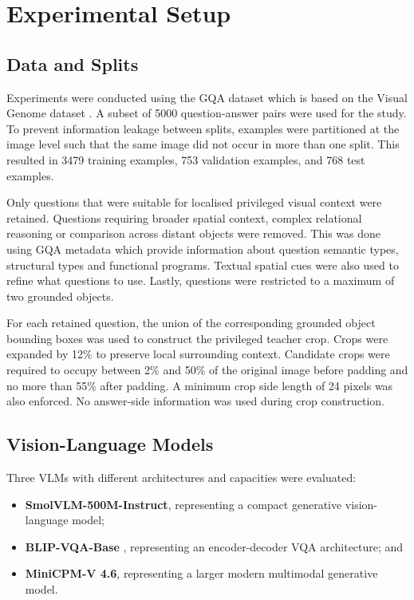 \section{Experimental Setup}\label{experimental_setup}


\subsection{Data and Splits}

Experiments were conducted using the GQA dataset which is based on the Visual Genome dataset \parencite{hudson2019gqa}.
A subset of 5000 question-answer pairs were used for the study. To prevent information leakage between
splits, examples were partitioned at the image level such that the same image did not occur in more than 
one split. This resulted in 3479 training examples, 753 validation examples, and 768 test examples.

Only questions that were suitable for localised privileged visual context were retained. Questions requiring
broader spatial context, complex relational reasoning or comparison across distant objects were removed. This
was done using GQA metadata which provide information about question semantic types, structural types and functional
programs. Textual spatial cues were also used to refine what questions to use. Lastly, questions were
restricted to a maximum of two grounded objects.

For each retained question, the union of the corresponding grounded object bounding boxes was used to 
construct the privileged teacher crop. Crops were expanded by 12\% to preserve local surrounding context.
Candidate crops were required to occupy between 2\% and 50\% of the original image before padding and no more
than 55\% after padding. A minimum crop side length of 24 pixels was also enforced. No answer-side information
was used during crop construction.

\subsection{Vision-Language Models}

Three VLMs with different architectures and capacities were evaluated:

\begin{itemize}
\item \textbf{SmolVLM-500M-Instruct}, representing a compact generative vision-language model;
\item \textbf{BLIP-VQA-Base} \cite{li2022blip}, representing an encoder-decoder VQA architecture; and
\item \textbf{MiniCPM-V 4.6}, representing a larger modern multimodal generative model.
\end{itemize}

